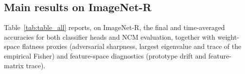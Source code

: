 \documentclass{article}
\theoremstyle{plain}
\theoremstyle{definition}
\theoremstyle{remark}
\begin{document}




\subsection{Main results on ImageNet-R}
\label{sec:results-main-inr}


 

Table~\ref{tab:table_all} reports, on ImageNet-R, the final and time-averaged accuracies for both classifier heads and NCM evaluation, together with weight-space flatness proxies (adversarial sharpness, largest eigenvalue and trace of the empirical Fisher) and feature-space diagnostics (prototype drift and feature-matrix trace). 
\end{document}
